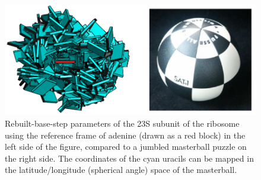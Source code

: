 \begin{figure}
\centering
\includegraphics[angle=0, scale=0.4]{Chapter2/masterball2.png}
\caption{Rebuilt-base-step  parameters  of  the  23S  subunit  of  the
  ribosome using the reference frame of adenine (drawn as a red block)
  in the  left side  of the figure,  compared to a  jumbled masterball
  puzzle on the right side. The coordinates of the cyan uracils can be
  mapped  in the  latitude/longitude  (spherical angle)  space of  the
  masterball.}
\label{fig:masterball}
\end{figure}




